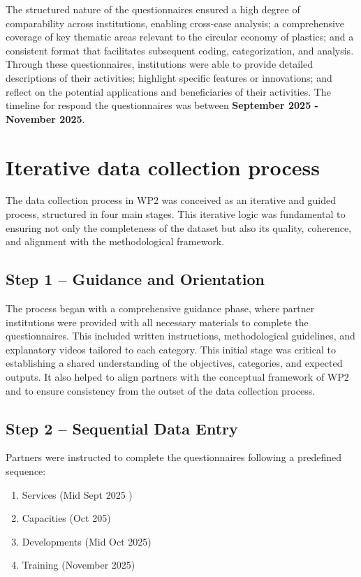 \documentclass[
  12pt,
  oneside]{book}
\providecommand{\tightlist}{%
  \setlength{\itemsep}{0pt}\setlength{\parskip}{0pt}}
\begin{document}
The structured nature of the questionnaires ensured a high degree of
comparability across institutions, enabling cross-case analysis; a
comprehensive coverage of key thematic areas relevant to the circular
economy of plastics; and a consistent format that facilitates subsequent
coding, categorization, and analysis. Through these questionnaires,
institutions were able to provide detailed descriptions of their
activities; highlight specific features or innovations; and reflect on
the potential applications and beneficiaries of their activities. The
timeline for respond the questionnaires was between \textbf{September
2025 - November 2025}.

\section{Iterative data collection
process}\label{iterative-data-collection-process}

The data collection process in WP2 was conceived as an iterative and
guided process, structured in four main stages. This iterative logic was
fundamental to ensuring not only the completeness of the dataset but
also its quality, coherence, and alignment with the methodological
framework.

\subsection{Step 1 -- Guidance and
Orientation}\label{step-1-guidance-and-orientation}

The process began with a comprehensive guidance phase, where partner
institutions were provided with all necessary materials to complete the
questionnaires. This included written instructions, methodological
guidelines, and explanatory videos tailored to each category. This
initial stage was critical to establishing a shared understanding of the
objectives, categories, and expected outputs. It also helped to align
partners with the conceptual framework of WP2 and to ensure consistency
from the outset of the data collection process.

\subsection{Step 2 -- Sequential Data
Entry}\label{step-2-sequential-data-entry}

Partners were instructed to complete the questionnaires following a
predefined sequence:

\begin{enumerate}
\def\labelenumi{\arabic{enumi}.}
\tightlist
\item
  Services (Mid Sept 2025 )
\item
  Capacities (Oct 205)
\item
  Developments (Mid Oct 2025)
\item
  Training (November 2025)
\end{enumerate}
\end{document}
